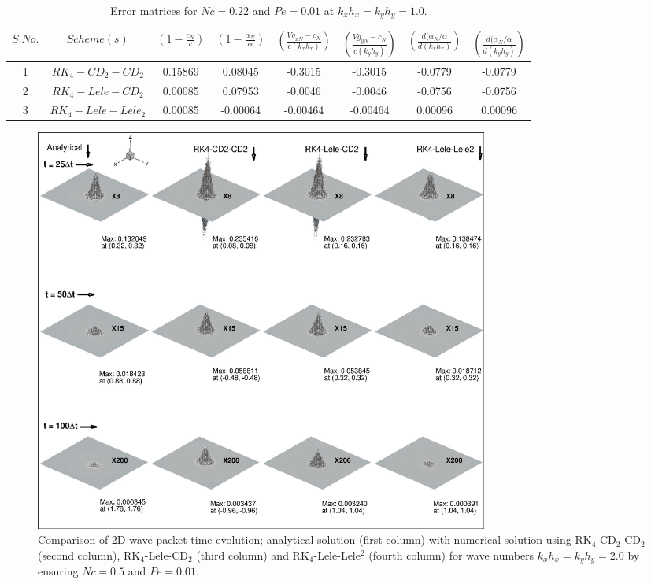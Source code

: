 \documentclass[showpacs,preprintnumbers,amsmath,amssymb]{revtex4-1} %
\begin{document}
\begin{table}[h!]
\begin{center}
\caption{Error matrices for $Nc=0.22$ and $Pe=0.01$ at $k_xh_x=k_yh_y=1.0$.}
\label{tab:table1}
\begin{tabular}{|c|c|c|c|c|c|c|c|} %
      \hline
      $S. No.$ & $Scheme(s)$ & $\left(1-\frac{c_N}{c}\right)$ & $\left(1-\frac{\alpha_N}{\alpha}\right)$ & $\left(\frac{Vg_{xN}-c_N}{c(k_xh_x)}\right)$ & $\left(\frac{Vg_{yN}-c_N}{c(k_yh_y)}\right)$ & $\left(\frac{d(\alpha_N/\alpha}{d(k_xh_x)}\right)$ & $\left(\frac{d(\alpha_N/\alpha}{d(k_yh_y)}\right)$ \\
      \hline
      1 & $RK_4-CD_2-CD_2$ & 0.15869 & 0.08045 & -0.3015 & -0.3015 & -0.0779 & -0.0779\\
      2 & $RK_4-Lele-CD_2$ & 0.00085 & 0.07953 & -0.0046 & -0.0046 & -0.0756 & -0.0756\\
      3 & $RK_4-Lele-Lele_2$ & 0.00085 & -0.00064 & -0.00464 & -0.00464 & 0.00096 & 0.00096\\
      \hline
\end{tabular}
\end{center}
\end{table}

\begin{figure}[h]
\begin{center}
\includegraphics[width=150mm]{wave_pack_all_k2.pdf}
\end{center}    
\raggedleft
\caption{Comparison of 2D wave-packet time evolution; analytical solution (first column) with numerical solution using RK$_4$-CD$_2$-CD$_2$ (second column), RK$_4$-Lele-CD$_2$ (third column) and RK$_4$-Lele-Lele$^2$ (fourth column) for wave numbers $k_xh_x=k_yh_y=2.0$ by ensuring $Nc=0.5$ and $Pe=0.01$.}
\label{fig_wave}
\end{figure}
\end{document}
